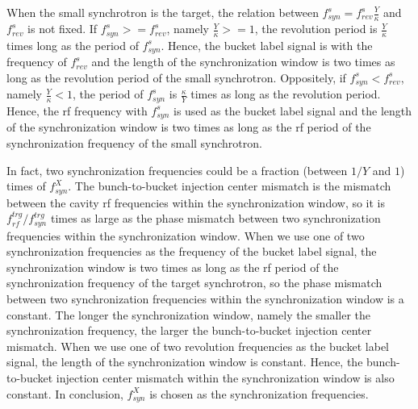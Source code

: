 When the small synchrotron is the target, the relation between $f_{\mathit{syn}}^{s}=f_{\mathit{rev}}^{s}\frac{Y}{\kappa}$ and $f_{\mathit{rev}}^{s}$ is not fixed. If $f_{\mathit{syn}}^{s}>=f_{\mathit{rev}}^{s}$, namely $\frac{Y}{\kappa}>=1$, the revolution period is $\frac{Y}{\kappa}$ times long as the period of $f_{\mathit{syn}}^{s}$. Hence, the bucket label signal is with the frequency of $f_{\mathit{rev}}^{s}$ and the length of the synchronization window is two times as long as the revolution period of the small synchrotron.
Oppositely,  if $f_{\mathit{syn}}^{s}<f_{\mathit{rev}}^{s}$, namely $\frac{Y}{\kappa}<1$, the period of $f_{\mathit{syn}}^{s}$ is $\frac{\kappa}{Y}$ times as long as the revolution period. Hence, the rf frequency with $f_{\mathit{syn}}^{s}$ is used as the bucket label signal and the length of the synchronization window is two times as long as the rf period of the synchronization frequency of the small synchrotron. 

In fact, two synchronization frequencies could be a fraction (between $1/Y$ and $1$) times of $f_{\mathit{syn}}^{X}$. The bunch-to-bucket injection center mismatch is the mismatch between the cavity rf frequencies within the synchronization window, so it is $f_{\mathit{rf}}^{trg}/f_{\mathit{syn}}^{trg}$ times as large as the phase mismatch between two synchronization frequencies within the synchronization window. When we use one of two synchronization frequencies as the frequency of the bucket label signal, the synchronization window is two times as long as the rf period of the synchronization frequency of the target synchrotron, so the phase mismatch between two synchronization frequencies within the synchronization window is a constant. The longer the synchronization window, namely the smaller the synchronization frequency, the larger the bunch-to-bucket injection center mismatch. When we use one of two revolution frequencies as the bucket label signal, the length of the synchronization window is constant. Hence, the bunch-to-bucket injection center mismatch within the synchronization window is also constant. In conclusion, $f_{\mathit{syn}}^{X}$ is chosen as the synchronization frequencies.




